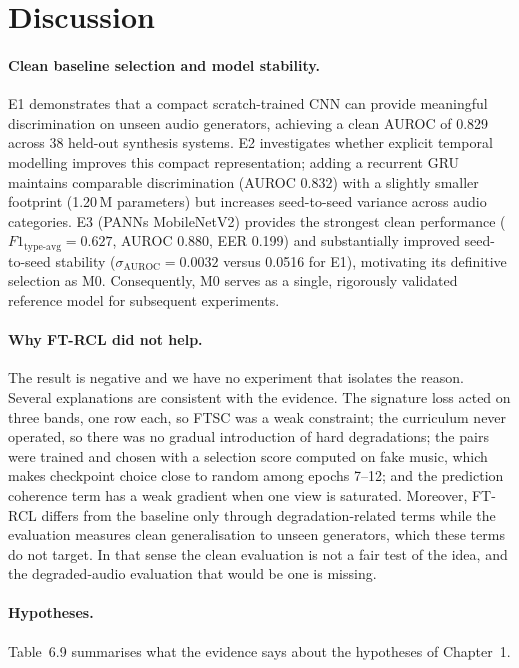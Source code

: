 \documentclass[12pt,a4paper]{report}
\begin{document}
\section{Discussion}
\label{sec:discussion}

\paragraph{Clean baseline selection and model stability.} E1 demonstrates that a compact scratch-trained CNN can provide meaningful discrimination on unseen audio generators, achieving a clean AUROC of 0.829 across 38 held-out synthesis systems. E2 investigates whether explicit temporal modelling improves this compact representation; adding a recurrent GRU maintains comparable discrimination (AUROC 0.832) with a slightly smaller footprint (1.20\,M parameters) but increases seed-to-seed variance across audio categories. E3 (PANNs MobileNetV2) provides the strongest clean performance ($F1_{\mathrm{type\text{-}avg}} = 0.627$, AUROC 0.880, EER 0.199) and substantially improved seed-to-seed stability ($\sigma_{\mathrm{AUROC}} = 0.0032$ versus 0.0516 for E1), motivating its definitive selection as M0. Consequently, M0 serves as a single, rigorously validated reference model for subsequent experiments.

\paragraph{Why FT-RCL did not help.} The result is negative and we have no experiment that isolates the reason. Several explanations are consistent with the evidence. The signature loss acted on three bands, one row each, so FTSC was a weak constraint; the curriculum never operated, so there was no gradual introduction of hard degradations; the pairs were trained and chosen with a selection score computed on fake music, which makes checkpoint choice close to random among epochs 7--12; and the prediction coherence term has a weak gradient when one view is saturated. Moreover, FT-RCL differs from the baseline only through degradation-related terms while the evaluation measures clean generalisation to unseen generators, which these terms do not target. In that sense the clean evaluation is not a fair test of the idea, and the degraded-audio evaluation that would be one is missing.

\paragraph{Hypotheses.} Table~6.9 summarises what the evidence says about the hypotheses of Chapter~1.
\end{document}
